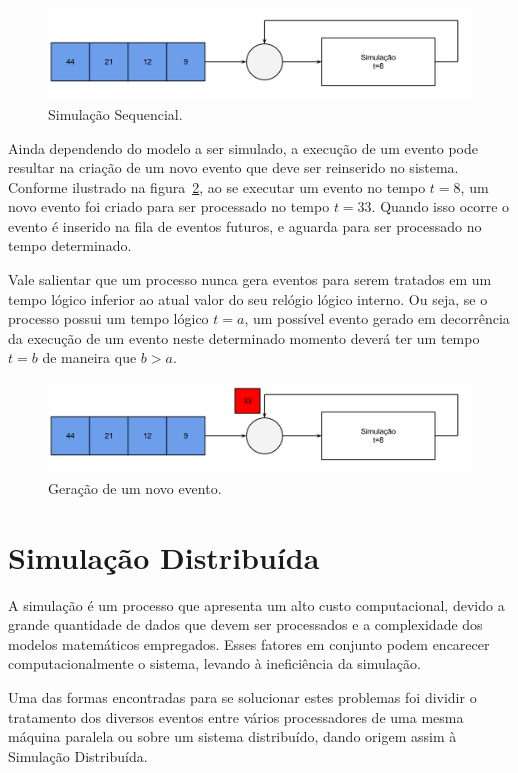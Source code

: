 \begin{figure}
  \centerline{\includegraphics[scale=0.4]{simul_sequencial.png}}
  \caption{Simulação Sequencial.}
\label{fig:simul}
\end{figure}

Ainda dependendo do modelo a ser simulado, a execução de um evento pode resultar na criação de um novo evento que deve ser reinserido no sistema. Conforme ilustrado na figura~\ref{fig:simul_2}, ao se executar um evento no tempo $t=8$, um novo evento foi criado para ser processado no tempo $t=33$. Quando isso ocorre o evento é inserido na fila de eventos futuros, e aguarda para ser processado no tempo determinado.

Vale salientar que um processo nunca gera eventos para serem tratados em um tempo lógico inferior ao atual valor do seu relógio lógico interno. Ou seja, se o processo possui um tempo lógico $t=a$, um possível evento gerado em decorrência da execução de um evento neste determinado momento deverá ter um tempo $t=b$ de maneira que $b>a$.

\begin{figure}
  \centerline{\includegraphics[scale=0.4]{simul_sequencial_2.png}}
  \caption{Geração de um novo evento.}
\label{fig:simul_2}
\end{figure}

\section{Simulação Distribuída}

A simulação é um processo que apresenta um alto custo computacional, devido a grande quantidade de dados que devem ser processados e a complexidade dos modelos matemáticos empregados. Esses fatores em conjunto podem encarecer computacionalmente o sistema, levando à ineficiência da simulação.

Uma das formas encontradas para se solucionar estes problemas foi dividir o tratamento dos diversos eventos entre vários processadores de uma mesma máquina paralela ou sobre um sistema distribuído, dando origem assim à Simulação Distribuída.

